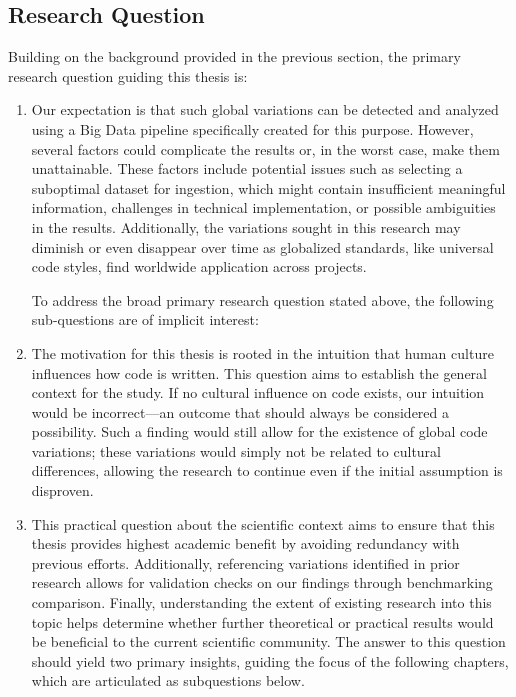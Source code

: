 \subsection{Research Question}
\label{sec:intro-research-question}

Building on the background provided in the previous section, the primary research question guiding this thesis is:

\begin{enumerate}
    \item[] 

    Our expectation is that such global variations can be detected and analyzed using a Big Data pipeline specifically created for this purpose.
    However, several factors could complicate the results or, in the worst case, make them unattainable.
    These factors include potential issues such as selecting a suboptimal dataset for ingestion, which might contain insufficient meaningful information, challenges in technical implementation, or possible ambiguities in the results.
    Additionally, the variations sought in this research may diminish or even disappear over time as globalized standards, like universal code styles, find worldwide application across projects.

    To address the broad primary research question stated above, the following sub-questions are of implicit interest:

    \item[] 

    The motivation for this thesis is rooted in the intuition that human culture influences how code is written.
    This question aims to establish the general context for the study.
    If no cultural influence on code exists, our intuition would be incorrect—an outcome that should always be considered a possibility.
    Such a finding would still allow for the existence of global code variations; these variations would simply not be related to cultural differences, allowing the research to continue even if the initial assumption is disproven.

    \item[] 

    This practical question about the scientific context aims to ensure that this thesis provides highest academic benefit by avoiding redundancy with previous efforts.
    Additionally, referencing variations identified in prior research allows for validation checks on our findings through benchmarking comparison.
    Finally, understanding the extent of existing research into this topic helps determine whether further theoretical or practical results would be beneficial to the current scientific community.
    The answer to this question should yield two primary insights, guiding the focus of the following chapters, which are articulated as subquestions below.


\end{enumerate}
